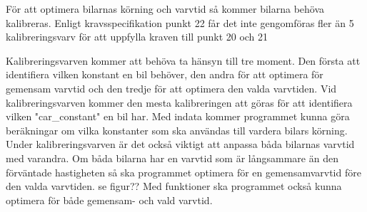 För att optimera bilarnas körning och varvtid så kommer bilarna behöva kalibreras. Enligt kravsspecifikation punkt 22 får det inte gengomföras fler än 5 kalibreringsvarv för att uppfylla kraven till punkt 20 och 21

Kalibreringsvarven kommer att behöva ta hänsyn till tre moment. Den första att identifiera vilken konstant en bil behöver, den andra för att optimera för gemensam varvtid och den tredje för att optimera den valda varvtiden. Vid kalibreringsvarven kommer den mesta kalibreringen att göras för att identifiera vilken "car_constant" en bil har. Med indata kommer programmet kunna göra beräkningar om vilka konstanter som ska användas till vardera bilars körning. Under kalibreringsvarven är det också viktigt att anpassa båda bilarnas varvtid med varandra. Om båda bilarna har en varvtid som är långsammare än den förväntade hastigheten så ska programmet optimera för en gemensamvarvtid före den valda varvtiden. se figur?? Med funktioner ska programmet också kunna optimera för både gemensam- och vald varvtid.

